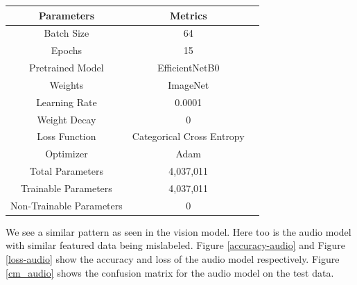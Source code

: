 \documentclass[fleqn, 10pt, twoside]{IOEGC}
\begin{document}
\begin{center}
	\begin{tabular}{ |c|c|c| }
		\hline
		\textbf{Parameters}      & \textbf{Metrics}          \\
		\hline
		Batch Size               & 64                        \\
		\hline
		Epochs                   & 15                        \\
		\hline
		Pretrained Model         & EfficientNetB0            \\
		\hline
		Weights                  & ImageNet                  \\
		\hline
		Learning Rate            & 0.0001                    \\
		\hline
		Weight Decay             & 0                         \\
		\hline
		Loss Function            & Categorical Cross Entropy \\
		\hline
		Optimizer                & Adam                      \\
		\hline
		Total Parameters         & 4,037,011                 \\
		\hline
		Trainable Parameters     & 4,037,011                 \\
		\hline
		Non-Trainable Parameters & 0                         \\
		\hline
	\end{tabular}
	\label{table:audio-model}
\end{center}
We see a similar pattern as seen in the vision model. Here too is the audio model with similar featured data being mislabeled. Figure \ref{accuracy-audio} and Figure \ref{loss-audio} show the accuracy and loss of the audio model respectively. Figure \ref{cm_audio} shows the confusion matrix for the audio model on the test data.
\end{document}
